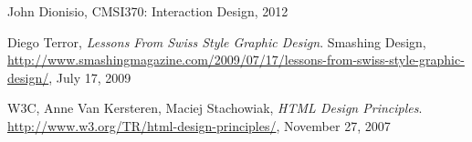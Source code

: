 \documentclass[12pt onesided letterpaper]{article}
\begin{document}
\begin{thebibliography}

    John Dionisio,
    CMSI370: Interaction Design,
    2012

    Diego Terror,
    \emph{Lessons From Swiss Style Graphic Design}.
    Smashing Design,
    \url{http://www.smashingmagazine.com/2009/07/17/lessons-from-swiss-style-graphic-design/},
    July 17, 2009

    W3C, Anne Van Kersteren, Maciej Stachowiak,
    \emph{HTML Design Principles}.
    \url{http://www.w3.org/TR/html-design-principles/},
    November 27, 2007


\end{thebibliography}
\end{document}
